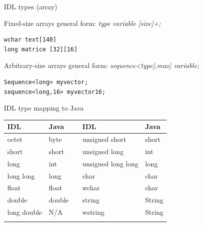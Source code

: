 \documentclass[bigger,hyperref={colorlinks=true, urlcolor=red, plainpages=false, pdfpagelabels, bookmarksnumbered}]{beamer}
\begin{document}
\begin{frame}[fragile,label=sec-4-7]{IDL types (array)}
 \begin{block}{Fixed-size arrays}
general form: \emph{type variable [size]+;}
\lstset{language=C,label= ,caption= ,numbers=none}
\begin{lstlisting}
wchar text[140]
long matrice [32][16]
\end{lstlisting}
\end{block}
\begin{block}{Arbitrary-size arrays}
general form: \emph{sequence<type[,max] variable;}
\lstset{language=C,label= ,caption= ,numbers=none}
\begin{lstlisting}
Sequence<long> myvector;
sequence<long,16> myvector16;
\end{lstlisting}
\end{block}
\end{frame}

\begin{frame}[label=sec-4-8]{IDL type mapping to Java}
\begin{center}
\begin{tabular}{lllll}
IDL & Java &  & IDL & Java\\
\hline
octet & byte &  & unsigned short & short\\
short & short &  & unsigned long & int\\
long & int &  & unsigned long long & long\\
long long & long &  & char & char\\
float & float &  & wchar & char\\
double & double &  & string & String\\
long double & N/A &  & wstring & String\\
 &  &  &  & \\
\end{tabular}
\end{center}
\end{frame}
\end{document}
